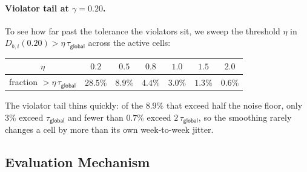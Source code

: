 \documentclass[sigconf, review]{acmart}
\newcommand{\NFG}{\tau_{\textsf{global}}}
\begin{document}

\paragraph{Violator tail at $\gamma = 0.20$.}
To see how far past the tolerance the violators sit, we sweep
the threshold $\eta$ in
$D_{b, i}(0.20) > \eta \, \NFG$
across the active cells:

\begin{center}
\small
\begin{tabular}{ccccccc}
\toprule
$\eta$ & $0.2$ & $0.5$ & $0.8$ & $1.0$ & $1.5$ & $2.0$ \\
\midrule
fraction $>\eta\,\NFG$
       & $28.5\%$ & $8.9\%$ & $4.4\%$ & $3.0\%$ & $1.3\%$ & $0.6\%$ \\
\bottomrule
\end{tabular}
\end{center}

\noindent
The violator tail thins quickly: of the $8.9\%$ that exceed
half the noise floor, only $3\%$ exceed $\NFG$ and fewer than
$0.7\%$ exceed $2\,\NFG$, so the smoothing rarely changes a
cell by more than its own week-to-week jitter. 


\subsection{Evaluation Mechanism}
\label{sec:evaluation-framework}
\end{document}
